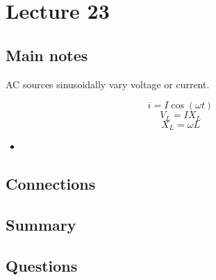 \section{Lecture 23}
\subsection{Main notes}
AC sources sinusoidally vary voltage or current.

\[
    i = I \cos (\omega t)
  \]
\[
V_L = IX_L
\]
\[
X_L = \omega L
  \]

\begin{itemize}
	\item
\end{itemize}


\subsection{Connections}


\subsection{Summary}


\subsection{Questions}

